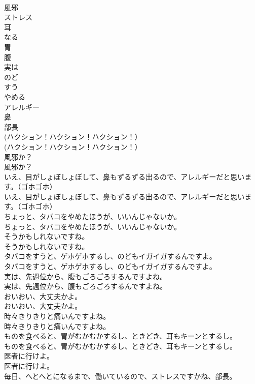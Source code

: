 \documentclass[8pt]{extreport}
\begin{document}
\begin{CJK}{UTF8}{min}
\\	風邪
\\	ストレス
\\	耳
\\	なる
\\	胃
\\	腹
\\	実は
\\	のど
\\	すう
\\	やめる
\\	アレルギー
\\	鼻
\\	部長
\\	(ハクション！ハクション！ハクション！）	
\\	(ハクション！ハクション！ハクション！） 
\\	風邪か？	
\\	風邪か？ 
\\	いえ、目がしょぼしょぼして、鼻もずるずる出るので、アレルギーだと思います。（ゴホゴホ）	
\\	いえ、目がしょぼしょぼして、鼻もずるずる出るので、アレルギーだと思います。（ゴホゴホ） 
\\	ちょっと、タバコをやめたほうが、いいんじゃないか。	
\\	ちょっと、タバコをやめたほうが、いいんじゃないか。 
\\	そうかもしれないですね。	
\\	そうかもしれないですね。 
\\	タバコをすうと、ゲホゲホするし、のどもイガイガするんですよ。	
\\	タバコをすうと、ゲホゲホするし、のどもイガイガするんですよ。 
\\	実は、先週位から、腹もごろごろするんですよね。	
\\	実は、先週位から、腹もごろごろするんですよね。 
\\	おいおい、大丈夫かよ。	
\\	おいおい、大丈夫かよ。 
\\	時々きりきりと痛いんですよね。	
\\	時々きりきりと痛いんですよね。 
\\	ものを食べると、胃がむかむかするし、ときどき、耳もキーンとするし。	
\\	ものを食べると、胃がむかむかするし、ときどき、耳もキーンとするし。 
\\	医者に行けよ。	
\\	医者に行けよ。 
\\	毎日、へとへとになるまで、働いているので、ストレスですかね、部長。	

\end{CJK}
\end{document}

